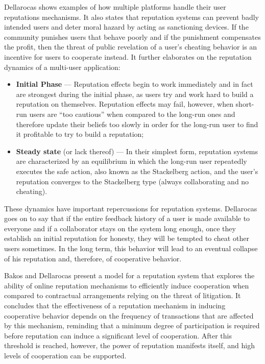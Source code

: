 Dellarocas \cite{Dellarocas2005-rep-mech} shows examples of how multiple platforms handle their user reputations mechanisms. It also states that reputation systems can prevent badly intended users and deter moral hazard by acting as sanctioning devices. If the community punishes users that behave poorly and if the punishment compensates the  profit, then the threat of public revelation of a user's cheating behavior is an incentive for users to cooperate instead. It further elaborates on the reputation dynamics of a multi-user application: 
\begin{itemize}
    \item \textbf{Initial Phase} --- Reputation effects begin to work immediately and in fact are strongest during the initial phase, as users try and work hard to build a reputation on themselves. Reputation effects may fail, however, when short-run users are “too cautious” when compared to the long-run ones and therefore update their beliefs too slowly in order for the long-run user to find it profitable to try to build a reputation;
    \item \textbf{Steady state} (or lack thereof) --- In their simplest form, reputation systems are characterized by an equilibrium in which the long-run user repeatedly executes the safe action, also known as the Stackelberg action, and the user's reputation converges to the Stackelberg type (always collaborating and no cheating).
\end{itemize}

These dynamics have important repercussions for reputation systems. Dellarocas goes on to say that if the entire feedback history of a user is made available to everyone and if a collaborator stays on the system long enough, once they establish an initial reputation for honesty, they will be tempted to cheat other users sometimes. In the long term, this behavior will lead to an eventual collapse of his reputation and, therefore, of cooperative behavior.

Bakos and Dellarocas \cite{Bakos2003} present a model for a reputation system that explores the ability of online reputation mechanisms to efficiently induce cooperation when compared to contractual arrangements relying on the threat of litigation. It concludes that the effectiveness of a reputation mechanism in inducing cooperative behavior depends on the frequency of transactions that are affected by this mechanism, reminding that a minimum degree of participation is required before reputation can induce a significant level of cooperation. After this threshold is reached, however, the power of reputation manifests itself, and high levels of cooperation can be supported.

